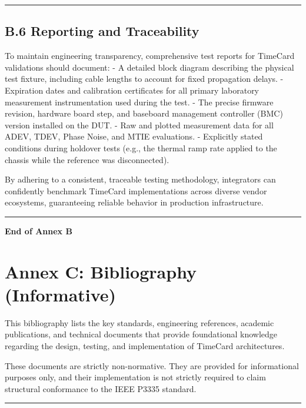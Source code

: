 \documentclass[
]{article}
\begin{document}
\begin{center}\rule{0.5\linewidth}{0.5pt}\end{center}

\subsection{B.6 Reporting and
Traceability}\label{b.6-reporting-and-traceability}

To maintain engineering transparency, comprehensive test reports for
TimeCard validations should document: - A detailed block diagram
describing the physical test fixture, including cable lengths to account
for fixed propagation delays. - Expiration dates and calibration
certificates for all primary laboratory measurement instrumentation used
during the test. - The precise firmware revision, hardware board step,
and baseboard management controller (BMC) version installed on the DUT.
- Raw and plotted measurement data for all ADEV, TDEV, Phase Noise, and
MTIE evaluations. - Explicitly stated conditions during holdover tests
(e.g., the thermal ramp rate applied to the chassis while the reference
was disconnected).

By adhering to a consistent, traceable testing methodology, integrators
can confidently benchmark TimeCard implementations across diverse vendor
ecosystems, guaranteeing reliable behavior in production infrastructure.

\begin{center}\rule{0.5\linewidth}{0.5pt}\end{center}

\textbf{End of Annex B}

\section{Annex C: Bibliography
(Informative)}\label{annex-c-bibliography-informative}

This bibliography lists the key standards, engineering references,
academic publications, and technical documents that provide foundational
knowledge regarding the design, testing, and implementation of TimeCard
architectures.

These documents are strictly non-normative. They are provided for
informational purposes only, and their implementation is not strictly
required to claim structural conformance to the IEEE P3335 standard.

\begin{center}\rule{0.5\linewidth}{0.5pt}\end{center}
\end{document}
